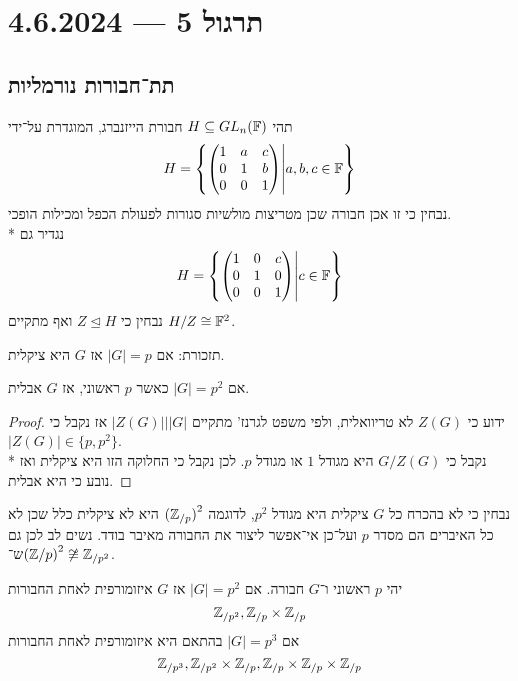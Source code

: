 \section{תרגול 5 --- 4.6.2024}
\subsection{תת־חבורות נורמליות}
\begin{example}
	תהי $H \subseteq GL_n(\mathbb{F})$ חבורת הייזנברג, המוגדרת על־ידי
	\[
		H = \left\{
			\begin{pmatrix}
				1 & a & c \\
				0 & 1 & b \\
				0 & 0 & 1
			\end{pmatrix}
			\middle|
			a, b, c \in \mathbb{F}
		\right\}
	\]
	נבחין כי זו אכן חבורה שכן מטריצות מולשיות סגורות לפעולת הכפל ומכילות הופכי. \\*
	נגדיר גם
	\[
		H = \left\{
			\begin{pmatrix}
				1 & 0 & c \\
				0 & 1 & 0 \\
				0 & 0 & 1
			\end{pmatrix}
			\middle|
			c \in \mathbb{F}
		\right\}
	\]
	נבחין כי $Z \trianglelefteq H$ ואף מתקיים $H/Z \cong \mathbb{F}^2$.
\end{example}
\begin{lemma}
	תזכורת: אם $|G| = p$ אז $G$ היא ציקלית.
\end{lemma}
\begin{lemma}
	אם $|G| = p^2$ כאשר $p$ ראשוני, אז $G$ אבלית.
\end{lemma}
\begin{proof}
	ידוע כי $Z(G)$ לא טריוואלית, ולפי משפט לגרנז' מתקיים $|Z(G)| \Big| |G|$ אז נקבל כי $|Z(G)| \in \{ p, p^2 \}$. \\*
	נקבל כי $G/Z(G)$ היא מגודל $1$ או מגודל $p$. לכן נקבל כי החלוקה הזו היא ציקלית ואז נובע כי היא אבלית.
\end{proof}
נבחין כי לא בהכרח כל $G$ ציקלית היא מגודל $p^2$, לדוגמה ${(\mathbb{Z}_{/p})}^2$ היא לא ציקלית כלל שכן לא כל האיברים הם מסדר $p$ ועל־כן אי־אפשר ליצור את החבורה מאיבר בודד. נשים לב לכן גם ש־${(\mathbb{Z}/p)}^2 \not\cong \mathbb{Z}_{/p^2}$.
\begin{proposition}
	יהי $p$ ראשוני ו־$G$ חבורה. אם $|G| = p^2$ אז $G$ איזומורפית לאחת החבורות
	\[
		\mathbb{Z}_{/p^2}, \mathbb{Z}_{/p} \times \mathbb{Z}_{/p}
	\]
	אם $|G| = p^3$ בהתאם היא איזומורפית לאחת החבורות
	\[
		\mathbb{Z}_{/p^3}, \mathbb{Z}_{/p^2} \times \mathbb{Z}_{/p}, \mathbb{Z}_{/p} \times \mathbb{Z}_{/p} \times \mathbb{Z}_{/p}
	\]
\end{proposition}


